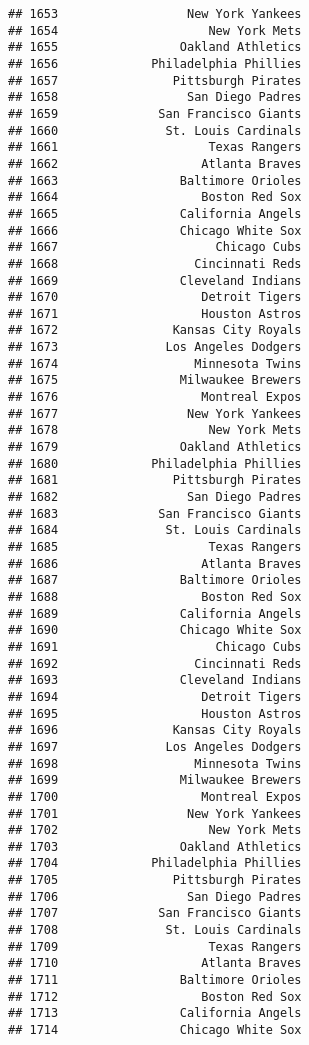 \documentclass[]{article}
\begin{document}
\begin{verbatim}
## 1653                  New York Yankees
## 1654                     New York Mets
## 1655                 Oakland Athletics
## 1656             Philadelphia Phillies
## 1657                Pittsburgh Pirates
## 1658                  San Diego Padres
## 1659              San Francisco Giants
## 1660               St. Louis Cardinals
## 1661                     Texas Rangers
## 1662                    Atlanta Braves
## 1663                 Baltimore Orioles
## 1664                    Boston Red Sox
## 1665                 California Angels
## 1666                 Chicago White Sox
## 1667                      Chicago Cubs
## 1668                   Cincinnati Reds
## 1669                 Cleveland Indians
## 1670                    Detroit Tigers
## 1671                    Houston Astros
## 1672                Kansas City Royals
## 1673               Los Angeles Dodgers
## 1674                   Minnesota Twins
## 1675                 Milwaukee Brewers
## 1676                    Montreal Expos
## 1677                  New York Yankees
## 1678                     New York Mets
## 1679                 Oakland Athletics
## 1680             Philadelphia Phillies
## 1681                Pittsburgh Pirates
## 1682                  San Diego Padres
## 1683              San Francisco Giants
## 1684               St. Louis Cardinals
## 1685                     Texas Rangers
## 1686                    Atlanta Braves
## 1687                 Baltimore Orioles
## 1688                    Boston Red Sox
## 1689                 California Angels
## 1690                 Chicago White Sox
## 1691                      Chicago Cubs
## 1692                   Cincinnati Reds
## 1693                 Cleveland Indians
## 1694                    Detroit Tigers
## 1695                    Houston Astros
## 1696                Kansas City Royals
## 1697               Los Angeles Dodgers
## 1698                   Minnesota Twins
## 1699                 Milwaukee Brewers
## 1700                    Montreal Expos
## 1701                  New York Yankees
## 1702                     New York Mets
## 1703                 Oakland Athletics
## 1704             Philadelphia Phillies
## 1705                Pittsburgh Pirates
## 1706                  San Diego Padres
## 1707              San Francisco Giants
## 1708               St. Louis Cardinals
## 1709                     Texas Rangers
## 1710                    Atlanta Braves
## 1711                 Baltimore Orioles
## 1712                    Boston Red Sox
## 1713                 California Angels
## 1714                 Chicago White Sox

\end{verbatim}
\end{document}

